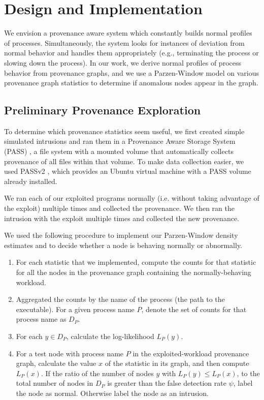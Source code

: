 \documentclass[10pt,twocolumn]{article}
\begin{document}
%

\section{Design and Implementation}

We envision a provenance aware system which constantly builds normal profiles of processes. Simultaneously,
the system looks for instances of deviation from normal behavior and handles them appropriately
(e.g., terminating the process or slowing down the process). In our work, we derive normal profiles of process behavior
from provenance graphs, and we use a Parzen-Window model on various provenance graph statistics
to determine if anomalous nodes appear in the graph.

\subsection{Preliminary Provenance Exploration}

To determine which provenance statistics seem useful, we first created simple simulated intrusions
and ran them in a Provenance Aware Storage System (PASS) \cite{pass}, a file system with
a mounted volume that automatically collects provenance of all files within that volume.
To make data collection easier, we used PASSv2 \cite{passv2}, which provides an Ubuntu virtual machine with a PASS volume already installed.

We ran each of our exploited programs normally (i.e. without taking advantage of the exploit) multiple times and collected the provenance. We then ran the
intrusion with the exploit multiple times and collected the new provenance.

We used the following procedure to implement our Parzen-Window density estimates and to decide whether a node is behaving normally or abnormally.
\begin{enumerate}
\item For each statistic that we implemented, compute the counts for that statistic for all the
nodes in the provenance graph containing the normally-behaving workload.
\item Aggregated the counts by the name of the process (the path to the executable). For a given process name $P$, denote the
set of counts for that process name as $D_P$.
\item For each $y \in D_P$, calculate the log-likelihood $L_P(y)$.
\item For a test node with process name $P$ in the exploited-workload provenance graph, calculate the value $x$ of the statistic in its graph, and then compute $L_P(x)$. 
If the ratio of the number of nodes $y$ with $L_P(y) \leq L_P(x)$,
to the total number of nodes in $D_P$ is greater than the false detection rate $\psi$, label the node as normal. Otherwise label the node as
an intrusion.
\end{enumerate}
\end{document}
